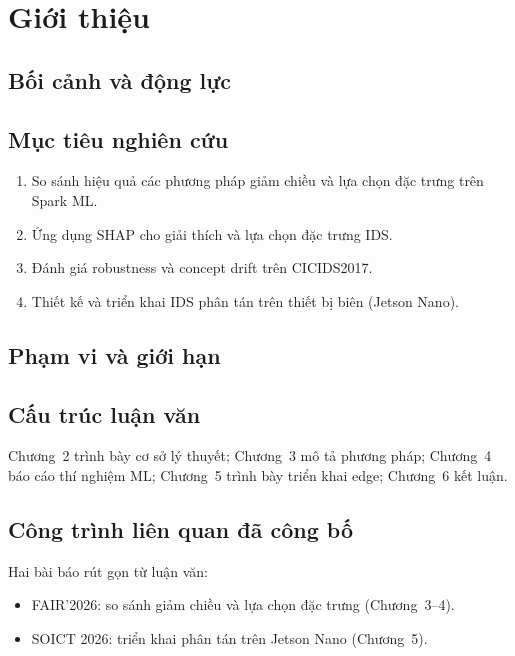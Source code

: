 \chapter{Giới thiệu}

\section{Bối cảnh và động lực}


\section{Mục tiêu nghiên cứu}

\begin{enumerate}
  \item So sánh hiệu quả các phương pháp giảm chiều và lựa chọn đặc trưng trên Spark ML.
  \item Ứng dụng SHAP cho giải thích và lựa chọn đặc trưng IDS.
  \item Đánh giá robustness và concept drift trên CICIDS2017.
  \item Thiết kế và triển khai IDS phân tán trên thiết bị biên (Jetson Nano).
\end{enumerate}

\section{Phạm vi và giới hạn}


\section{Cấu trúc luận văn}

Chương~2 trình bày cơ sở lý thuyết; Chương~3 mô tả phương pháp; Chương~4 báo cáo thí nghiệm ML; Chương~5 trình bày triển khai edge; Chương~6 kết luận.

\section{Công trình liên quan đã công bố}

Hai bài báo rút gọn từ luận văn:
\begin{itemize}
  \item FAIR'2026: so sánh giảm chiều và lựa chọn đặc trưng (Chương~3--4).
  \item SOICT 2026: triển khai phân tán trên Jetson Nano (Chương~5).
\end{itemize}
